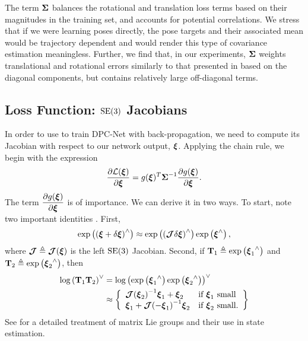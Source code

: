 The term $\boldsymbol{\mathbf{\Sigma}}$ balances the rotational and translation loss terms based on their magnitudes in the training set, and accounts for potential correlations. We stress that if we were learning poses directly, the pose targets and their associated mean would be trajectory dependent and would render this type of covariance estimation meaningless. Further, we find that, in our experiments, $\boldsymbol{\mathbf{\Sigma}}$ weights translational and rotational errors similarly to that presented in \cite{Kendall2017-u} %
 based on the diagonal components, but contains relatively large off-diagonal terms.

\subsection{Loss Function: $\mathrm{SE}(3)$ Jacobians}
In order to use  to train DPC-Net with back-propagation, we need to compute its Jacobian with respect to our network output, $\boldsymbol{\mathbf{\xi}}$. Applying the chain rule, we begin with the expression
\begin{equation}
	\label{eq:se3_jacobchainrule}
	\dfrac{\partial \mathcal{L} (\boldsymbol{\mathbf{\xi}}) }{\partial  \boldsymbol{\mathbf{\xi}}} =  g({\boldsymbol{\mathbf{\xi}}})^T {\boldsymbol{\mathbf{\Sigma}}}^{-1} \dfrac{\partial g({\boldsymbol{\mathbf{\xi}}})}{\partial \boldsymbol{\mathbf{\xi}}}.
\end{equation}
The term $\dfrac{\partial g({\boldsymbol{\mathbf{\xi}}})}{\partial \boldsymbol{\mathbf{\xi}}}$ is of importance. We can derive it in two ways. To start, note two important identities \cite{Barfoot2017-ri}. First,
\begin{equation}
	\label{eq:delta_xi_exp}
\mathrm{exp}\left({( \boldsymbol{\mathbf{\xi}} + \delta \boldsymbol{\mathbf{\xi}})}^{\wedge}\right) \approx \mathrm{exp}\left({(\boldsymbol{\mathbf{\mathcal{J}}} \delta \boldsymbol{\mathbf{\xi}})}^{\wedge}\right) \mathrm{exp}\left({\boldsymbol{\mathbf{\xi}}}^{\wedge}\right),
\end{equation}
where $\boldsymbol{\mathbf{\mathcal{J}}} \triangleq \boldsymbol{\mathbf{\mathcal{J}}}(\boldsymbol{\mathbf{\xi}})$ is the left $\mathrm{SE}(3)$ Jacobian.
Second, if $\boldsymbol{\mathbf{T}}_1 \triangleq \mathrm{exp}\left({\boldsymbol{\mathbf{\xi}}_1}^{\wedge}\right)$ and $\boldsymbol{\mathbf{T}}_2 \triangleq \mathrm{exp}\left({\boldsymbol{\mathbf{\xi}}_2}^{\wedge}\right)$, then
\begin{align}
	\label{eq:jacobian_xi_small}
\mathrm{log}\left({\boldsymbol{\mathbf{T}}_1 \boldsymbol{\mathbf{T}}_2}\right)^{\vee} &= \mathrm{log}\left({ \mathrm{exp}\left({\boldsymbol{\mathbf{\xi}}_1}^{\wedge}\right) \mathrm{exp}\left({\boldsymbol{\mathbf{\xi}}_2}^{\wedge}\right) }\right)^{\vee} \nonumber \\
								  &\approx \left\{
	\begin{array}{ll}
		{  \boldsymbol{\mathbf{\mathcal{J}}}  (  \boldsymbol{\mathbf{\xi}}  _2)}^{-1} \boldsymbol{\mathbf{\xi}}_1 + \boldsymbol{\mathbf{\xi}}_2   & \mbox{if } \boldsymbol{\mathbf{\xi}}_1 ~ \mbox{small} \\
		\boldsymbol{\mathbf{\xi}}_1 + {\boldsymbol{\mathbf{\mathcal{J}}}(-\boldsymbol{\mathbf{\xi}}_1)}^{-1} \boldsymbol{\mathbf{\xi}}_2 & \mbox{if } \boldsymbol{\mathbf{\xi}}_2 ~ \mbox{small}.
	\end{array}
\right\}
\end{align}
See \cite{Barfoot2017-ri} for a detailed treatment of matrix Lie groups and their use in state estimation.
